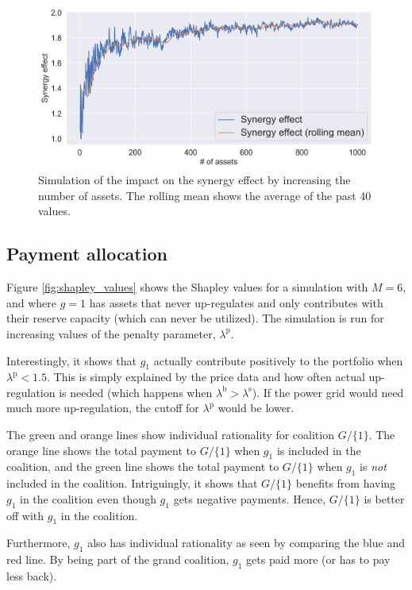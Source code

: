 \documentclass[lettersize,journal]{IEEEtran}
\begin{document}
\begin{figure}[!t]
    \centering
    \includegraphics[width=\columnwidth]{figures/synergy_effect.png}
    \caption{Simulation of the impact on the synergy effect by increasing the number of assets. The rolling mean shows the average of the past 40 values.}
    \label{fig:synergy_effect}
\end{figure}

\subsection{Payment allocation}

Figure \ref{fig:shapley_values} shows the Shapley values for a simulation with $M = 6$, and where $g = 1$ has assets that never up-regulates and only contributes with their reserve capacity (which can never be utilized). The simulation is run for increasing values of the penalty parameter, $\lambda^{\text{p}}$.

Interestingly, it shows that $g_1$ actually contribute positively to the portfolio when $\lambda^{\text{p}} < 1.5$. This is simply explained by the price data and how often actual up-regulation is needed (which happens when $\lambda^{\text{b}} > \lambda^{\text{s}}$). If the power grid would need much more up-regulation, the cutoff for $\lambda^{\text{p}}$ would be lower.

The green and orange lines show individual rationality for coalition $G / \{1\}$. The orange line shows the total payment to $G / \{1\}$ when $g_1$ is included in the coalition, and the green line shows the total payment to $G / \{1\}$ when $g_1$ is \textit{not} included in the coalition. Intriguingly, it shows that $G / \{1\}$ benefits from having $g_1$ in the coalition even though $g_1$ gets negative payments. Hence, $G / \{1\}$ is better off with $g_1$ in the coalition. 

Furthermore, $g_1$ also has individual rationality as seen by comparing the blue and red line. By being part of the grand coalition, $g_1$ gets paid more (or has to pay less back).
\end{document}
